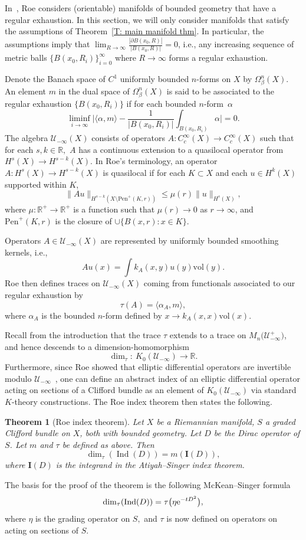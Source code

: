 \documentclass[pdftex]{sigma}
\numberwithin{equation}{section}
\newtheorem{Theorem}{Theorem}[section]
\begin{document}
In~\cite{Roe1988a}, Roe considers (orientable) manifolds of bounded geometry that have a regular exhaustion. In this section, we will only consider manifolds that satisfy the assumptions of Theorem~\ref{T: main manifold thm}. In particular, the assumptions imply that $\lim_{R\to \infty}\frac{|\partial B(x_0, R)|}{|B(x_0, R)|} = 0$, i.e., any increasing sequence of metric balls $\{B(x_0, R_i)\}_{i=0}^\infty$ where $R\to\infty$ forms a regular exhaustion.

Denote the Banach space of $C^1$ uniformly bounded $n$-forms on $X$ by $\Omega^n_{\beta}(X)$. An element $m$ in the dual space of $\Omega^n_{\beta}(X)$ is said to be associated to the regular exhaustion $\{B(x_0, R_i)\}$ if for each bounded $n$-form~$\alpha$ \[\liminf_{i\to \infty} \bigg| \langle \alpha, m \rangle - \frac{1}{|B(x_0, R_i)|} \int_{B(x_0, R_i)} \alpha\bigg| = 0.\]
The algebra $\mathcal{U}_{-\infty}(X)$ consists of operators $A\colon C_c^\infty(X) \to C_c^\infty(X)$ such that for each $s,k\in \mathbb{R},$ $A$ has a continuous extension to a quasilocal operator from $H^s(X) \to H^{s-k}(X)$. In Roe's terminology, an operator $A\colon H^s(X) \to H^{s-k}(X)$ is quasilocal if for each $K \subset X$ and each $u\in H^k(X)$ supported within $K$,
\[
\| Au\|_{H^{s-k}(X\setminus \text{Pen}^+(K,r))} \leq \mu(r) \| u \|_{H^s(X)},
\]
where $\mu\colon \mathbb{R}^+ \to \mathbb{R}^+$ is a function such that $\mu(r) \to 0$ as $r \to \infty$, and $\text{Pen}^+(K,r)$ is the closure of $\cup \{B(x,r) \colon x\in K\}$.

Operators $A \in \mathcal{U}_{-\infty}(X)$ are represented by uniformly bounded smoothing kernels, i.e.,
\[
Au(x) = \int k_A(x,y)u(y) \text{vol}(y).
\]
Roe then defines traces on $\mathcal{U}_{-\infty}(X)$ coming from functionals associated to our regular exhaustion by{\samepage
\[
\tau(A) = \langle \alpha_A, m\rangle,
\]
where $\alpha_A$ is the bounded $n$-form defined by $x\to k_A(x,x)\text{vol}(x)$.}

Recall from the introduction that the trace $\tau$ extends to a trace on $M_n\big(\mathcal{U}_{-\infty}^+\big)$, and hence descends to a dimension-homomorphism
\[
\dim_\tau\colon \ K_0(\mathcal{U}_{-\infty}) \to \mathbb{R}.
\]
Furthermore, since Roe showed that elliptic differential operators are invertible modulo $\mathcal{U}_{-\infty}$~\cite{Roe1988a}, one can define an abstract index of an elliptic differential operator acting on sections of a Clifford bundle as an element of $K_0(\mathcal{U}_{-\infty})$ via standard $K$-theory constructions. The Roe index theorem then states the following.
\begin{Theorem}[Roe index theorem]
Let $X$ be a Riemannian manifold, $S$ a graded Clifford bundle on $X$, both with bounded geometry. Let $D$ be the Dirac operator of $S$. Let $m$ and $\tau$ be defined as above. Then
\[
 \dim_\tau (\operatorname{Ind}(D)) = m(\mathbf{I}(D)),
\]
where $\mathbf{I}(D)$ is the integrand in the Atiyah--Singer index theorem.
\end{Theorem}
The basis for the proof of the theorem is the following McKean--Singer formula
\[
 \dim_{\tau}(\operatorname{Ind}(D)) = \tau\big(\eta {\rm e}^{-tD^2}\big),
\]
where $\eta$ is the grading operator on $S,$ and $\tau$ is now defined on operators on acting on sections of $S$.
\end{document}
